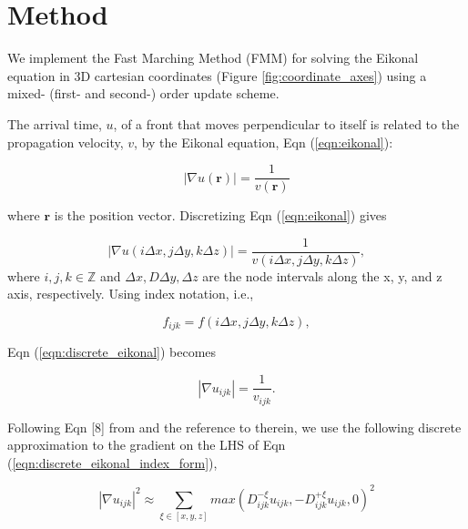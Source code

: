\section{Method}
	We implement the Fast Marching Method (FMM) for solving the Eikonal equation in 3D cartesian coordinates (Figure \ref{fig:coordinate_axes}) using a mixed- (first- and second-) order update scheme.
	\par
	
	

	The arrival time, $u$, of a front that moves perpendicular to itself is related to the propagation velocity, $v$, by the Eikonal equation, Eqn (\ref{eqn:eikonal}):
	
	\begin{equation}
		\label{eqn:eikonal}
		\left|\nabla u\left(\mathbf{r}\right)\right| = \frac{1}{v\left(\mathbf{r}\right)}
	\end{equation}
	
	\noindent where $\mathbf{r}$ is the position vector. Discretizing Eqn (\ref{eqn:eikonal}) gives
	
	\begin{equation}
		\label{eqn:discrete_eikonal}
		\left|\nabla u\left(i\Delta x, j\Delta y, k\Delta z\right)\right| = \frac{1}{v\left(i\Delta x, j\Delta y, k\Delta z\right)},
	\end{equation}
	\noindent	where $i, j, k \in \mathbb{Z}$ and $\Delta x, D\Delta y, \Delta z$ are the node intervals along the x, y, and z axis, respectively. Using index notation, i.e.,
	
	\begin{equation}
		f_{ijk} = f\left(i\Delta x, j\Delta y, k\Delta z\right),
	\end{equation}
	
	\noindent Eqn (\ref{eqn:discrete_eikonal}) becomes
	
	\begin{equation}
		\label{eqn:discrete_eikonal_index_form}
			\left|\nabla u_{ijk}\right| = \frac{1}{v_{ijk}}.
	\end{equation}
	
	Following Eqn [8] from  and the reference to  therein, we use the following discrete approximation to the gradient on the LHS of Eqn (\ref{eqn:discrete_eikonal_index_form}),
	
	\begin{equation}
		\label{eqn:gradient_approximation}
		\left|\nabla u_{ijk}\right| ^2 \approx 
		\sum_{\xi \in \left[x, y, z\right]} max\left(D^{-\xi}_{ijk}u_{ijk}, -D^{+\xi}_{ijk}u_{ijk}, 0 \right)^2
	\end{equation}
	
